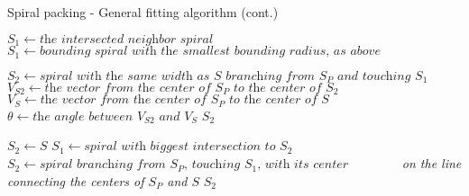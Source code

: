 \documentclass[11pt, oneside]{article}   	%
\begin{document}
\begin{algorithm}[H]
	\caption{Spiral packing - General fitting algorithm (cont.)}\label{euclid}
	\begin{algorithmic}[1]
			
			\State
				\State $S_{1} \gets \textit{the intersected neighbor spiral}$
			\Else
				\State $S_{1} \gets \textit{bounding spiral with the smallest bounding radius, as above}$
			\EndIf		
			\State
			
			\State $S_{2} \gets \textit{spiral with the same width as $S$ branching from $S_{P}$ and touching $S_{1}$}$
				\State $V_{S2} \gets \textit{the vector from the center of $S_{P}$ to the center of $S_{2}$}$
				\State $V_{S} \gets \textit{the vector from the center of $S_{P}$ to the center of $S$}$
				\State $\theta \gets \textit{the angle between $V_{S2}$ and $V_{S}$}$
				\If{$\theta \leq 12.5\degree$}
					\State \Return $S_{2}$
				\EndIf
			\EndIf
			\State
			
			\State $S_{2} \gets S$
				\State $S_{1} \gets \textit{spiral with biggest intersection to $S_{2}$}$
				\State $S_{2} \gets \textit{spiral branching from $S_{P}$, touching $S_{1}$, with its center}$
				\State \textit{~~~~~~~ on the line connecting the centers of $S_{P}$ and $S$}
			\EndWhile
			\State \Return $S_{2}$
		\EndFunction
	\end{algorithmic}
\end{algorithm}
\end{document}

